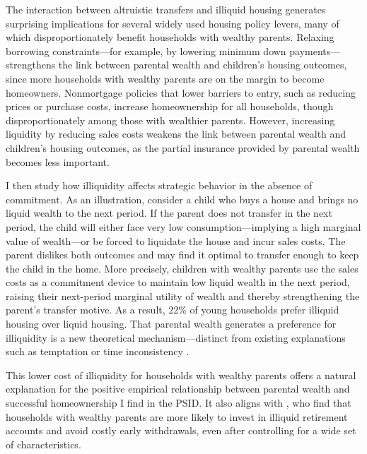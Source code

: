 \documentclass[12pt]{article}
\begin{document}
The interaction between altruistic transfers and illiquid housing generates surprising implications for several widely used housing policy levers, many of which disproportionately benefit households with wealthy parents. Relaxing borrowing constraints---for example, by lowering minimum down payments---strengthens the link between parental wealth and children's housing outcomes, since more households with wealthy parents are on the margin to become homeowners. Nonmortgage policies that lower barriers to entry, such as reducing prices or purchase costs, increase homeownership for all households, though disproportionately among those with wealthier parents. However, increasing liquidity by reducing sales costs weakens the link between parental wealth and children's housing outcomes, as the partial insurance provided by parental wealth becomes less important.

I then study how illiquidity affects strategic behavior in the absence of commitment. As an illustration, consider a child who buys a house and brings no liquid wealth to the next period. If the parent does not transfer in the next period, the child will either face very low consumption---implying a high marginal value of wealth---or be forced to liquidate the house and incur sales costs. The parent dislikes both outcomes and may find it optimal to transfer enough to keep the child in the home. More precisely, children with wealthy parents use the sales costs as a commitment device to maintain low liquid wealth in the next period, raising their next-period marginal utility of wealth and thereby strengthening the parent’s transfer motive. As a result, 22\% of young households prefer illiquid housing over liquid housing. That parental wealth generates a preference for illiquidity is a new theoretical mechanism---distinct from existing explanations such as temptation or time inconsistency \citep[e.g.,][]{attanasio2024temptation,laibson1997golden}.

This lower cost of illiquidity for households with wealthy parents offers a natural explanation for the positive empirical relationship between parental wealth and successful homeownership I find in the PSID. It also aligns with \citet{choukhmane2023benefits}, who find that households with wealthy parents are more likely to invest in illiquid retirement accounts and avoid costly early withdrawals, even after controlling for a wide set of characteristics.
\end{document}
